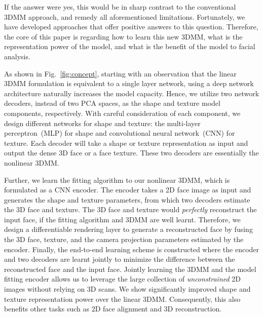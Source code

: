 If the answer were yes, this would be in sharp contrast to the conventional 3DMM approach, and remedy all aforementioned limitations.
Fortunately, we have developed approaches that offer positive answers to this question.
Therefore, the core of this paper is regarding how to learn this new 3DMM, what is the representation power of the model, and what is the benefit of the model to facial analysis.

As shown in Fig.~\ref{fig:concept}, starting with an observation that the linear 3DMM formulation is equivalent to a single layer network, using a deep network architecture naturally increases the model capacity. 
Hence, we utilize two network decoders, instead of two PCA spaces, as the shape and texture model components, respectively.
With careful consideration of each component, we design different networks  for shape and texture: the multi-layer perceptron~(MLP) for shape and convolutional neural network~(CNN) for texture.
Each decoder will take a shape or texture representation as input and output the dense 3D face or a face texture.
These two decoders are essentially the nonlinear 3DMM.

Further, we learn the fitting algorithm to our nonlinear 3DMM, which is formulated as a CNN encoder.
The encoder takes a 2D face image as input and generates the shape and texture parameters, from which two decoders estimate the 3D face and texture.
The 3D face and texture would {\it perfectly} reconstruct the input face, if the fitting algorithm and 3DMM are well learnt.
Therefore, we design a differentiable rendering layer to generate a reconstructed face by fusing the 3D face, texture, and the camera projection parameters estimated by the encoder. 
Finally, the end-to-end  learning scheme is constructed where the encoder and two decoders are learnt jointly to minimize the difference between the reconstructed face and the input face.
Jointly learning the 3DMM and the model fitting encoder allows us to leverage the large collection of {\it unconstrained} 2D images without relying on 3D scans.
We show significantly improved shape and texture representation power over the linear 3DMM. 
Consequently, this also benefits other tasks such as 2D face alignment and 3D reconstruction.


